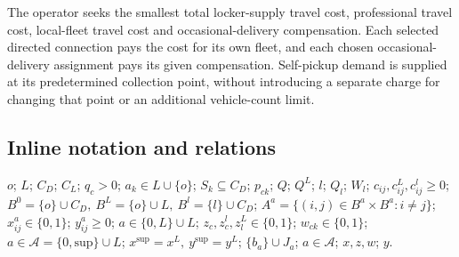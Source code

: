 \documentclass[10pt]{article}
\begin{document}
The operator seeks the smallest total locker-supply travel cost, professional travel cost, local-fleet travel cost and occasional-delivery compensation. Each selected directed connection pays the cost for its own fleet, and each chosen occasional-delivery assignment pays its given compensation. Self-pickup demand is supplied at its predetermined collection point, without introducing a separate charge for changing that point or an additional vehicle-count limit.

\subsection*{Inline notation and relations}
$o$; $L$; $C_D$; $C_L$; $q_c>0$; $a_k\in L\cup\{o\}$; $S_k\subseteq C_D$; $p_{ck}$; $Q$; $Q^L$; $l$; $Q_l$; $W_l$; $c_{ij},c^L_{ij},c^l_{ij}\ge0$; $B^0=\{o\}\cup C_D,\ B^L=\{o\}\cup L,\ B^l=\{l\}\cup C_D$; $A^a=\{(i,j)\in B^a\times B^a:i\ne j\}$; $x^a_{ij}\in\{0,1\}$; $y^a_{ij}\ge0$; $a\in\{0,L\}\cup L$; $z_c,z_c^l,z_l^L\in\{0,1\}$; $w_{ck}\in\{0,1\}$; $a\in\mathcal A=\{0,\mathrm{sup}\}\cup L$; $x^{\mathrm{sup}}=x^L,\ y^{\mathrm{sup}}=y^L$; $\{b_a\}\cup J_a$; $a\in\mathcal A$; $x,z,w$; $y$.
\end{document}
